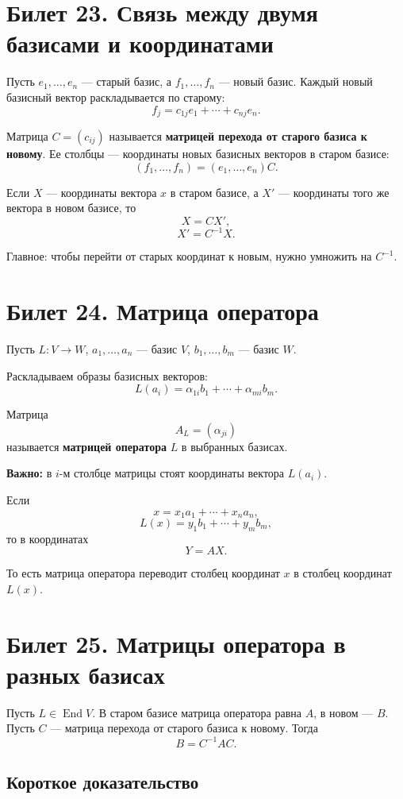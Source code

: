 \documentclass[12pt,a4paper]{article}
\DeclareMathOperator{\End}{End}
\begin{document}
\section{Билет 23. Связь между двумя базисами и координатами}

Пусть $e_1,\ldots,e_n$ --- старый базис, а $f_1,\ldots,f_n$ --- новый базис. Каждый новый базисный вектор раскладывается по старому:
\[
    f_j=c_{1j}e_1+\cdots+c_{nj}e_n.
\]

Матрица $C=(c_{ij})$ называется \textbf{матрицей перехода от старого базиса к новому}. Ее столбцы --- координаты новых базисных векторов в старом базисе:
\[
    (f_1,\ldots,f_n)=(e_1,\ldots,e_n)C.
\]

Если $X$ --- координаты вектора $x$ в старом базисе, а $X'$ --- координаты того же вектора в новом базисе, то
\[
    X=CX',
\]
\[
    X'=C^{-1}X.
\]

Главное: чтобы перейти от старых координат к новым, нужно умножить на $C^{-1}$.

\section{Билет 24. Матрица оператора}

Пусть $L:V\to W$, $a_1,\ldots,a_n$ --- базис $V$, $b_1,\ldots,b_m$ --- базис $W$.

Раскладываем образы базисных векторов:
\[
    L(a_i)=\alpha_{1i}b_1+\cdots+\alpha_{mi}b_m.
\]

Матрица
\[
    A_L=(\alpha_{ji})
\]
называется \textbf{матрицей оператора} $L$ в выбранных базисах.

\textbf{Важно:} в $i$-м столбце матрицы стоят координаты вектора $L(a_i)$.

Если
\[
    x=x_1a_1+\cdots+x_na_n,
\]
\[
    L(x)=y_1b_1+\cdots+y_mb_m,
\]
то в координатах
\[
    Y=AX.
\]

То есть матрица оператора переводит столбец координат $x$ в столбец координат $L(x)$.

\section{Билет 25. Матрицы оператора в разных базисах}

Пусть $L\in\End V$. В старом базисе матрица оператора равна $A$, в новом --- $B$. Пусть $C$ --- матрица перехода от старого базиса к новому. Тогда
\[
    B=C^{-1}AC.
\]

\subsection*{Короткое доказательство}
\end{document}
